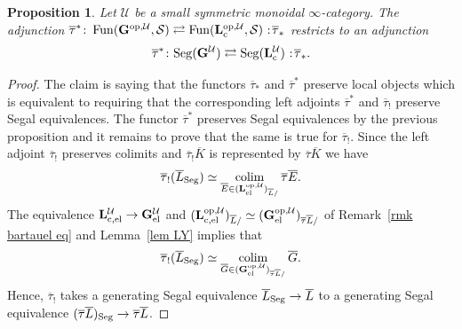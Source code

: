 \documentclass{amsart}
\numberwithin{theorem}{subsection}
\newtheorem{proposition}[theorem]{Proposition}
\theoremstyle{definition}
\providecommand{\op}{\mathrm{op}}
\providecommand{\xel}{\mathrm{el}}
\newcommand{\xFun}{\operatorname{Fun}}
\DeclareMathOperator*{\colim}{colim}
\newcommand{\xS}{\mathcal{S}}
\newcommand{\xU}{\mathcal{U}}
\newcommand*\cocolon{%
	\nobreak
	\mskip6mu plus1mu
	\mathpunct{}%
	\nonscript
	\mkern-\thinmuskip
	{:}%
	\mskip2mu
	\relax
}
\newcommand{\name}[1]{\ensuremath{\text{\textup{#1}}}}
\newcommand{\levelg}{\mathbf{L}}
\newcommand{\levelgconn}{\levelg_{\name{c}}}
\newcommand{\levelcUel}{\levelg_{\name{c},\name{el}}^{\xU}}
\newcommand{\levelcU}{\levelgconn^{\xU}}
\newcommand{\oplevelcU}{\levelg^{\op,\xU}_{\name{c}}}
\newcommand{\oplevelcUel}{\levelg^{\op,\xU}_{\name{c},\xel}}
\newcommand{\bbY}{\mathbf{G}}
\newcommand{\bbYU}{\bbY^\xU}
\newcommand{\bbYUel}{\bbY_{\xel}^{\xU}}
\newcommand{\opbbYU}{\bbY^{\op,\xU}}
\newcommand{\opbbYUel}{\bbY^{\op,\xU}_{\name{el}}}
\newcommand{\bartau}{\overline{\tau}}
\newcommand{\Seg}{\name{Seg}}
\begin{document}
\begin{proposition}
\label{proposition right kan extension of bartau restricts}
	Let $\xU$ be a small symmetric monoidal $\infty$-category.
The adjunction 
$\bartau^*\colon \xFun(\opbbYU,\xS)\rightleftarrows \xFun(\oplevelcU, \xS) \cocolon \bartau_*$ restricts to an adjunction
\[ \bartau^* \colon \Seg(\bbYU)\rightleftarrows \Seg(\levelcU) \cocolon \bartau_*.\]
\end{proposition}
\begin{proof}
The claim is saying that the functors $\bartau_*$ and $\bartau^*$ preserve local objects which is equivalent to requiring that the corresponding left adjoints $\bartau^*$ and $\bartau_!$ preserve Segal equivalences. 
The functor $\bartau^*$ preserves Segal equivalences by the previous proposition and it remains to prove that the same is true for $\bartau_!$. 
Since the left adjoint $\bartau_!$ preserves colimits and $\bartau_! \overline K$ is represented by $\bartau \overline K$ we have \[\bartau_!(\overline L_\Seg)\simeq \colim_{\overline E\in (\levelg^{\op,\xU}_\xel)_{\overline L/}} \bartau\overline E. \] 
The equivalence $\levelcUel \to \bbYUel$ and
$(\oplevelcUel)_{\overline L/}\simeq (\opbbYUel)_{\bartau \overline L/}$ of Remark~\ref{rmk bartauel eq} and Lemma~\ref{lem LY} implies that \[ \bartau_!(\overline L_\Seg)\simeq \colim_{\overline G\in (\opbbYUel)_{\bartau \overline L/}} \overline G.\] 
Hence, $\bartau_!$ takes a generating Segal equivalence $\overline L_\Seg\to \overline L$ to a generating Segal equivalence $(\bartau \overline L)_{\Seg}\to \bartau \overline L$. 
\end{proof}
\end{document}
